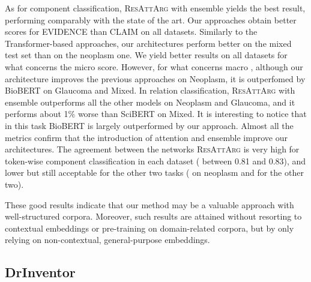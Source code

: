 \documentclass[journal]{IEEEtran}
\begin{document}
As for component classification, \textsc{ResAttArg} with ensemble yields the best result, performing comparably with the state of the art.
Our approaches obtain better scores for EVIDENCE than CLAIM on all datasets. Similarly to the Transformer-based approaches, our architectures perform better on the mixed test set than on the neoplasm one.
We yield better results on all datasets for what concerns the micro  score. However, for what concerns macro , although our architecture improves the previous approaches on Neoplasm, it is outperfomed by BioBERT on Glaucoma and Mixed.
In relation classification, \textsc{ResAttArg} with ensemble outperforms all the other models on Neoplasm and Glaucoma, and it performs about 1\% worse than SciBERT on Mixed. It is interesting to notice that in this task BioBERT is largely outperformed by our approach.
Almost all the metrics confirm that the introduction of attention and ensemble improve our architectures.
The agreement between the networks \textsc{ResAttArg} is very high for token-wise component classification in each dataset ( between 0.81 and 0.83), and lower but still acceptable for the other two tasks ( on neoplasm and  for the other two).

These good results indicate that our method may be a valuable approach with well-structured corpora. Moreover, such results are attained without resorting to contextual embeddings or pre-training on domain-related corpora, but by only relying on non-contextual, general-purpose embeddings. 









\subsection{DrInventor}


\iffalse
        \begin{figure}[t]
          \centering
          \texttt{[image: figs/confusion\_drinv.png]}
          \caption{Confusion matrix for component classification on DrInventor.
          \label{fig:confusion_drinv}}
        \end{figure}
\fi
\end{document}
